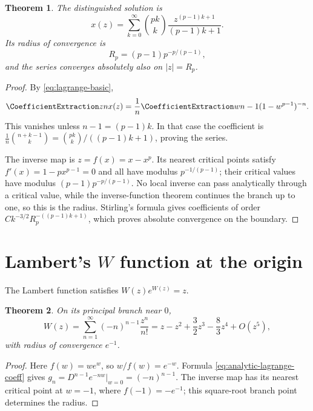 \documentclass[11pt,a4paper,oneside,openany]{book}
\newtheorem{theorem}{Theorem}[chapter]
\theoremstyle{definition}
\theoremstyle{remark}
\begin{document}
\begin{theorem}\label{thm:fuss-series}
The distinguished solution is
\begin{equation}\label{eq:fuss-series}
 x(z)=\sum_{k=0}^{\infty}\binom{pk}{k}
       \frac{z^{(p-1)k+1}}{(p-1)k+1}.
\end{equation}
Its radius of convergence is
\begin{equation}\label{eq:fuss-radius}
 R_p=(p-1)p^{-p/(p-1)},
\end{equation}
and the series converges absolutely also on $|z|=R_p$.
\end{theorem}
\begin{proof}
By \eqref{eq:lagrange-basic},
\[
 \CoefficientExtraction znx(z)=\frac1n\CoefficientExtraction w{n-1}(1-w^{p-1})^{-n}.
\]
This vanishes unless $n-1=(p-1)k$.  In that case the coefficient is
$\frac1n\binom{n+k-1}{k}=\binom{pk}{k}/((p-1)k+1)$, proving the series.

The inverse map is $z=f(x)=x-x^p$.  Its nearest critical points satisfy
$f'(x)=1-px^{p-1}=0$ and all have modulus $p^{-1/(p-1)}$; their critical values
have modulus $(p-1)p^{-p/(p-1)}$.  No local inverse can pass analytically through
a critical value, while the inverse-function theorem continues the branch up to
one, so this is the radius.  Stirling's formula gives coefficients of order
$Ck^{-3/2}R_p^{-((p-1)k+1)}$, which proves absolute convergence on the boundary.
\end{proof}

\section{Lambert's \texorpdfstring{$W$}{W} function at the origin}
The Lambert function satisfies $W(z)e^{W(z)}=z$.
\begin{theorem}\label{thm:lambert-W-zero}
On its principal branch near $0$,
\begin{equation}\label{eq:lambert-W-zero}
 W(z)=\sum_{n=1}^{\infty}(-n)^{n-1}\frac{z^n}{n!}
 =z-z^2+\frac32z^3-\frac83z^4+O(z^5),
\end{equation}
with radius of convergence $e^{-1}$.
\end{theorem}
\begin{proof}
Here $f(w)=we^w$, so $w/f(w)=e^{-w}$.  Formula
\eqref{eq:analytic-lagrange-coeff} gives
$g_n=D^{n-1}e^{-nw}|_{w=0}=(-n)^{n-1}$.  The inverse map has its nearest critical
point at $w=-1$, where $f(-1)=-e^{-1}$; this square-root branch point determines
the radius.
\end{proof}
\end{document}

